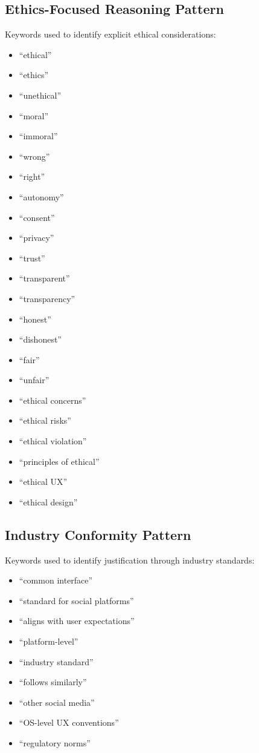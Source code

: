 \subsection{Ethics-Focused Reasoning Pattern}
Keywords used to identify explicit ethical considerations:
\begin{itemize}
\item ``ethical''
\item ``ethics''
\item ``unethical''
\item ``moral''
\item ``immoral''
\item ``wrong''
\item ``right''
\item ``autonomy''
\item ``consent''
\item ``privacy''
\item ``trust''
\item ``transparent''
\item ``transparency''
\item ``honest''
\item ``dishonest''
\item ``fair''
\item ``unfair''
\item ``ethical concerns''
\item ``ethical risks''
\item ``ethical violation''
\item ``principles of ethical''
\item ``ethical UX''
\item ``ethical design''
\end{itemize}

\subsection{Industry Conformity Pattern}
Keywords used to identify justification through industry standards:
\begin{itemize}
\item ``common interface''
\item ``standard for social platforms''
\item ``aligns with user expectations''
\item ``platform-level''
\item ``industry standard''
\item ``follows similarly''
\item ``other social media''
\item ``OS-level UX conventions''
\item ``regulatory norms''
\end{itemize}

